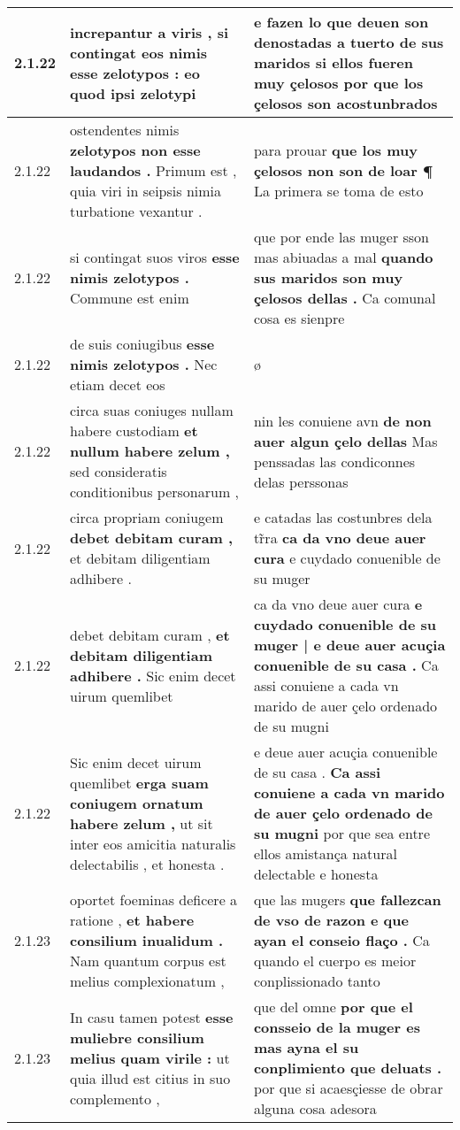 \begin{tabular}{|p{1cm}|p{6.5cm}|p{6.5cm}|}
2.1.22 & increpantur a viris , \textbf{ si contingat eos nimis esse zelotypos : } eo quod ipsi zelotypi & e fazen lo que deuen son denostadas a tuerto de sus maridos \textbf{ si ellos fueren muy çelosos } por que los çelosos son acostunbrados \\\hline
2.1.22 & ostendentes nimis \textbf{ zelotypos non esse laudandos . } Primum est , quia viri in seipsis nimia turbatione vexantur . & para prouar \textbf{ que los muy çelosos non son de loar ¶ } La primera se toma de esto \\\hline
2.1.22 & si contingat suos viros \textbf{ esse nimis zelotypos . } Commune est enim & que por ende las muger sson mas abiuadas a mal \textbf{ quando sus maridos son muy çelosos dellas . } Ca comunal cosa es sienpre \\\hline
2.1.22 & de suis coniugibus \textbf{ esse nimis zelotypos . } Nec etiam decet eos & ø \\\hline
2.1.22 & circa suas coniuges nullam habere custodiam \textbf{ et nullum habere zelum , } sed consideratis conditionibus personarum , & nin les conuiene avn \textbf{ de non auer algun çelo dellas } Mas penssadas las condiconnes delas perssonas \\\hline
2.1.22 & circa propriam coniugem \textbf{ debet debitam curam , } et debitam diligentiam adhibere . & e catadas las costunbres dela tr̃ra \textbf{ ca da vno deue auer cura } e cuydado conuenible de su muger \\\hline
2.1.22 & debet debitam curam , \textbf{ et debitam diligentiam adhibere . } Sic enim decet uirum quemlibet & ca da vno deue auer cura \textbf{ e cuydado conuenible de su muger | e deue auer acuçia conuenible de su casa . } Ca assi conuiene a cada vn marido de auer çelo ordenado de su mugni \\\hline
2.1.22 & Sic enim decet uirum quemlibet \textbf{ erga suam coniugem ornatum habere zelum , } ut sit inter eos amicitia naturalis delectabilis , et honesta . & e deue auer acuçia conuenible de su casa . \textbf{ Ca assi conuiene a cada vn marido de auer çelo ordenado de su mugni } por que sea entre ellos amistança natural delectable e honesta \\\hline
2.1.23 & oportet foeminas deficere a ratione , \textbf{ et habere consilium inualidum . } Nam quantum corpus est melius complexionatum , & que las mugers \textbf{ que fallezcan de vso de razon e que ayan el conseio flaço . } Ca quando el cuerpo es meior conplissionado tanto \\\hline
2.1.23 & In casu tamen potest \textbf{ esse muliebre consilium melius quam virile : } ut quia illud est citius in suo complemento , & que del omne \textbf{ por que el consseio de la muger es mas ayna el su conplimiento que deluats . } por que si acaesçiesse de obrar alguna cosa adesora \\\hline

\end{tabular}
